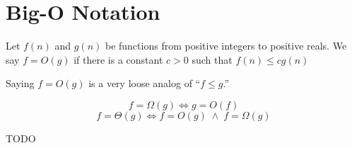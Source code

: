 \section{Big-O Notation}

\begin{definition}
Let $f(n)$ and $g(n)$ be functions from positive integers to positive reals. We say $f = O(g)$ if there is a constant $c>0$ such that $f(n)\le cg(n)$
\end{definition}
Saying $f = O(g)$ is a very loose analog of “$f \le g$.” 
\begin{definition}
\[
f=\Omega (g) \Longleftrightarrow g=O(f)
\]
\[
f=\Theta (g) \Longleftrightarrow f=O(g)\;\land\;f=\Omega(g) 
\]
\end{definition}

\begin{example}
\huge TODO
\end{example}